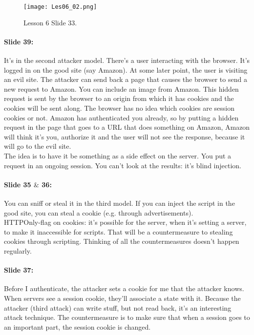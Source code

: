 \documentclass[10pt,a4paper]{report}
\begin{document}
\begin{figure}[ht!]
\centering
\texttt{[image: Les06\_02.png]}
\caption{Lesson 6 Slide 33.} 
\label{les06_02}
\end{figure}

\paragraph{Slide 39:} It's in the second attacker model. There's a user interacting with the browser. It's logged in on the good site (say Amazon). At some later point, the user is visiting an evil site. The attacker can send back a page that causes the browser to send a new request to Amazon. You can include an image from Amazon. This hidden request is sent by the browser to an origin from which it has cookies and the cookies will be sent along. The browser has no idea which cookies are session cookies or not. Amazon has authenticated you already, so by putting a hidden request in the page that goes to a URL that does something on Amazon, Amazon will think it's you, authorize it and the user will not see the response, because it will go to the evil site.\\
The idea is to have it be something as a side effect on the server. You put a request in an ongoing session. You can't look at the results: it's blind injection. 

\paragraph{Slide 35 $\&$ 36:} You can sniff or steal it in the third model. If you can inject the script in the good site, you can steal a cookie (e.g. through advertisements). \\
HTTPOnly-flag on cookies: it's possible for the server, when it's setting a server, to make it inaccessible for scripts. That will be a countermeasure to stealing cookies through scripting. 
Thinking of all the countermeasures doesn't happen regularly. 

\paragraph{Slide 37:} Before I authenticate, the attacker sets a cookie for me that the attacker knows. When servers see a session cookie, they'll associate a state with it. Because the attacker (third attack) can write stuff, but not read back, it's an interesting attack technique. The countermeasure is to make sure that when a session goes to an important part, the session cookie is changed. 
\end{document}
